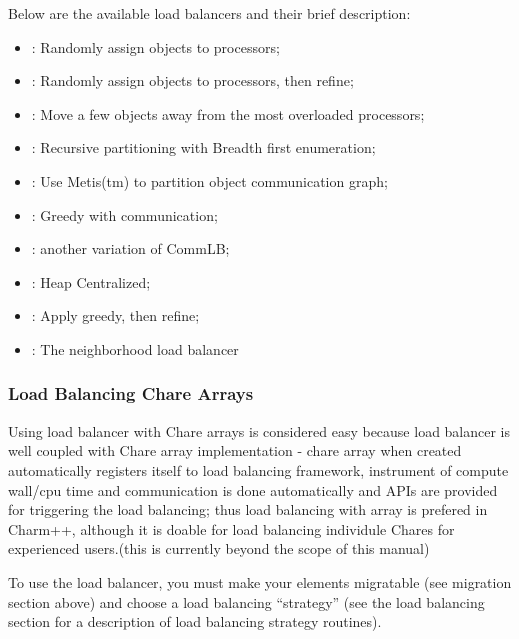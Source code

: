 Below are the available load balancers and their brief description:
\begin{itemize}
\item {}:   Randomly assign objects to processors;
\item {}:    Randomly assign objects to processors, then refine;
\item {}:     Move a few objects away from the most overloaded processors;
\item {}:        Recursive partitioning with Breadth first enumeration;
\item {}:      Use Metis(tm) to partition object communication graph;
\item {}:       Greedy with communication;
\item {}:      another variation of CommLB;
\item {}:   Heap Centralized;
\item {}:  Apply greedy, then refine;
\item {}:   The neighborhood load balancer
\end{itemize}

\subsubsection{Load Balancing Chare Arrays}
\label{lbarray}

Using load balancer with Chare arrays is considered easy because
load balancer is well coupled with Chare array implementation - 
chare array when created automatically registers itself to load balancing
framework, instrument of compute wall/cpu time and communication is 
done automatically and APIs are provided for triggering the load balancing; 
thus load balancing with array is prefered in Charm++, although it is doable 
for load balancing individule Chares for experienced users.(this is currently
beyond the scope of this manual)

To use the load balancer, you must make your elements migratable
(see migration section above) and choose a load balancing 
``strategy'' (see the load balancing section for a description
of load balancing strategy routines).

